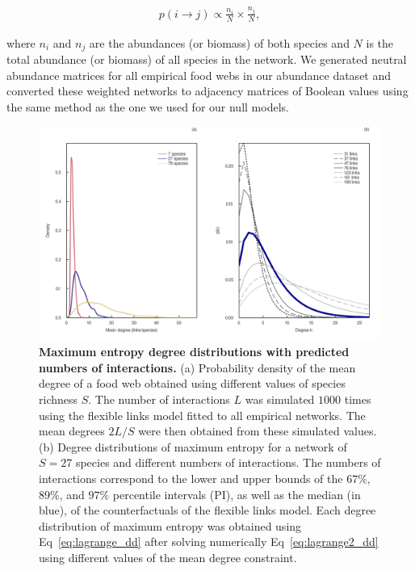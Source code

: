 \begin{box3.2}
\begin{eqnarray}
\label{eq:neutralmodel}
    p(i \rightarrow j) \propto \frac{n_i}{N} \times \frac{n_j}{N},
\end{eqnarray}
  
where $n_i$ and $n_j$ are the abundances (or biomass) of both species and $N$ is
the total abundance (or biomass) of all species in the network. We generated
neutral abundance matrices for all empirical food webs in our abundance dataset
and converted these weighted networks to adjacency matrices of Boolean values
using the same method as the one we used for our null models. 

\end{box3.2}

\begin{figure}[!h]
  \centering
  \includegraphics[width=\textwidth]{figures/article2/maxent_degree_dist_fl.png}
  \caption{\textbf{Maximum entropy degree distributions with predicted numbers of interactions.}
  (a) Probability density of the mean degree of a food web obtained using
  different values of species richness $S$. The number of interactions $L$ was
  simulated $1000$ times using the flexible links model fitted to all empirical
  networks. The mean degrees $2L/S$ were then obtained
  from these simulated values. (b) Degree distributions of maximum entropy for a
  network of $S=27$ species and different numbers of interactions. The numbers
  of interactions correspond to the lower and upper bounds of the $67\%$,
  $89\%$, and $97\%$ percentile intervals (PI), as well as the median (in blue),
  of the counterfactuals of the flexible links model. Each degree distribution
  of maximum entropy was obtained using Eq~\ref{eq:lagrange_dd} after solving
  numerically Eq~\ref{eq:lagrange2_dd} using different values of the mean
  degree constraint.}
  \label{fig:degree_dist_fl}
\end{figure}

